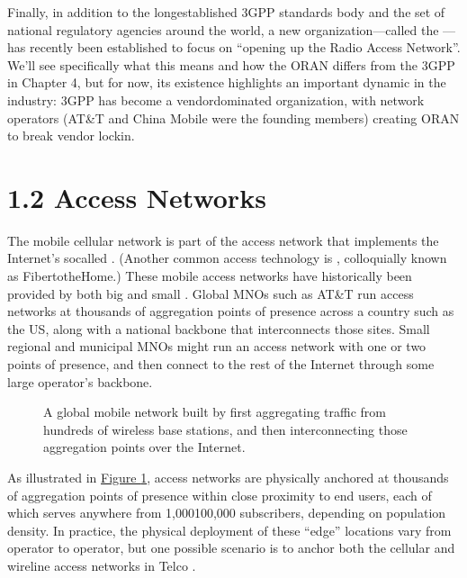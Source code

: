 \documentclass[a4paper,11pt,english]{sphinxmanual}
\let\sphinxpxdimen\pdfpxdimen\else\newdimen\sphinxpxdimen
\begin{document}
\sphinxAtStartPar
Finally, in addition to the long\sphinxhyphen{}established 3GPP standards body and
the set of national regulatory agencies around the world, a new
organization—called the  —has recently been
established to focus on “opening up the Radio Access Network”. We’ll
see specifically what this means and how the O\sphinxhyphen{}RAN differs from the
3GPP in Chapter 4, but for now, its existence highlights an important
dynamic in the industry: 3GPP has become a vendor\sphinxhyphen{}dominated
organization, with network operators (AT\&T and China Mobile were the
founding members) creating O\sphinxhyphen{}RAN to break vendor lock\sphinxhyphen{}in.


\section{1.2 Access Networks}
\label{\detokenize{intro:access-networks}}
\sphinxAtStartPar
The mobile cellular network is part of the access network that
implements the Internet’s so\sphinxhyphen{}called . (Another common
access technology is , colloquially
known as Fiber\sphinxhyphen{}to\sphinxhyphen{}the\sphinxhyphen{}Home.) These mobile access networks have
historically been provided by both big and small . Global MNOs such as AT\&T run access networks at
thousands of aggregation points of presence across a country such as the
US, along with a national backbone that interconnects those
sites. Small regional and municipal MNOs might run an access network
with one or two points of presence, and then connect to the rest of
the Internet through some large operator’s backbone.

\begin{figure}[ht]
\centering
\capstart

\noindent\sphinxincludegraphics[width=500\sphinxpxdimen]{{Slide1}.png}
\caption{A global mobile network built by first aggregating traffic from
hundreds of wireless base stations, and then interconnecting those
aggregation points over the Internet.}\label{\detokenize{intro:id3}}\label{\detokenize{intro:fig-global}}\end{figure}

\sphinxAtStartPar
As illustrated in \hyperref[\detokenize{intro:fig-global}]{Figure \ref{\detokenize{intro:fig-global}}}, access networks
are physically anchored at thousands of aggregation points of presence
within close proximity to end users, each of which serves anywhere
from 1,000\sphinxhyphen{}100,000 subscribers, depending on population density. In
practice, the physical deployment of these “edge” locations vary from
operator to operator, but one possible scenario is to anchor both the
cellular and wireline access networks in Telco .
\end{document}

